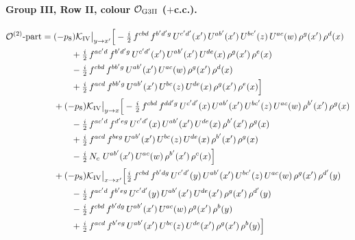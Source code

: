 \documentclass[10pt]{article}
\numberwithin{equation}{section}
\newcommand{\OO}{\mathcal O}
\newcommand{\KK}{\mathcal K}
\begin{document}
\paragraph{Group III, Row II, colour $\OO_{\rm G3II}$ ($+$c.c.).}
\begin{align}
\OO^{(2)}\text{-part}={}&(-p_8)\KK_{\rm IV}\big|_{y\to x'}\Big[-\tfrac{i}{2}\,f^{cbd}\,f^{b'd'g}\,U^{c'd'}(x')\,U^{ab'}(x')\,U^{bc'}(z)\,U^{ac}(w)\,\rho^{g}(x')\,\rho^{d}(x)\notag\\
&\qquad+\tfrac{i}{2}\,f^{ac'd}\,f^{b'd'g}\,U^{c'd'}(x')\,U^{ab'}(x')\,U^{de}(x)\,\rho^{g}(x')\,\rho^{e}(x)\notag\\
&\qquad-\tfrac{i}{2}\,f^{cbd}\,f^{bb'g}\,U^{ab'}(x')\,U^{ac}(w)\,\rho^{g}(x')\,\rho^{d}(x)\notag\\
&\qquad+\tfrac{i}{2}\,f^{acd}\,f^{bb'g}\,U^{ab'}(x')\,U^{bc}(z)\,U^{de}(x)\,\rho^{g}(x')\,\rho^{e}(x)\Big]\notag\\
&+(-p_8)\KK_{\rm IV}\big|_{y\to x}\Big[-\tfrac{i}{2}\,f^{cbd}\,f^{dd'g}\,U^{c'd'}(x)\,U^{ab'}(x')\,U^{bc'}(z)\,U^{ac}(w)\,\rho^{b'}(x')\,\rho^{g}(x)\notag\\
&\qquad-\tfrac{i}{2}\,f^{ac'd}\,f^{d'eg}\,U^{c'd'}(x)\,U^{ab'}(x')\,U^{de}(x)\,\rho^{b'}(x')\,\rho^{g}(x)\notag\\
&\qquad+\tfrac{i}{2}\,f^{acd}\,f^{beg}\,U^{ab'}(x')\,U^{bc}(z)\,U^{de}(x)\,\rho^{b'}(x')\,\rho^{g}(x)\notag\\
&\qquad-\tfrac{i}{2}\,N_c\,\,U^{ab'}(x')\,U^{ac}(w)\,\rho^{b'}(x')\,\rho^{c}(x)\Big]\notag\\
&+(-p_8)\KK_{\rm IV}\big|_{x\to x'}\Big[\tfrac{i}{2}\,f^{cbd}\,f^{b'dg}\,U^{c'd'}(y)\,U^{ab'}(x')\,U^{bc'}(z)\,U^{ac}(w)\,\rho^{g}(x')\,\rho^{d'}(y)\notag\\
&\qquad-\tfrac{i}{2}\,f^{ac'd}\,f^{b'eg}\,U^{c'd'}(y)\,U^{ab'}(x')\,U^{de}(x')\,\rho^{g}(x')\,\rho^{d'}(y)\notag\\
&\qquad-\tfrac{i}{2}\,f^{cbd}\,f^{b'dg}\,U^{ab'}(x')\,U^{ac}(w)\,\rho^{g}(x')\,\rho^{b}(y)\notag\\
&\qquad+\tfrac{i}{2}\,f^{acd}\,f^{b'eg}\,U^{ab'}(x')\,U^{bc}(z)\,U^{de}(x')\,\rho^{g}(x')\,\rho^{b}(y)\Big]
\end{align}
\end{document}
